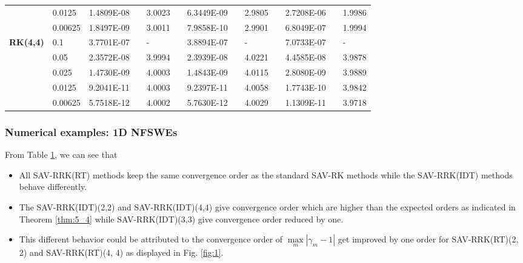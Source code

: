 \documentclass[aspectratio=169]{beamer}
\begin{document}
\begin{frame}
\begin{table}[H]
\begin{tabular}{lllllrlrlrlrlrl}
	  \multicolumn{2}{l}{} & \multicolumn{2}{l}{0.0125} & 1.4809E-08 &       & 3.0023  &       & 6.3449E-09 &       & 2.9805  &       & 2.7208E-06 &       & 1.9986  \\
	  \multicolumn{2}{l}{} & \multicolumn{2}{l}{0.00625} & 1.8497E-09 &       & 3.0011  &       & 7.9858E-10 &       & 2.9901  &       & 6.8049E-07 &       & 1.9994  \\
	  \multicolumn{2}{l}{\multirow{5}[1]{*}{\textbf{RK(4,4)}}} & \multicolumn{2}{l}{0.1} & 3.7701E-07 &       & -     &       & 3.8894E-07 &       & -     &       & 7.0733E-07 &       & - \\
	  \multicolumn{2}{l}{} & \multicolumn{2}{l}{0.05} & 2.3572E-08 &       & 3.9994  &       & 2.3939E-08 &       & 4.0221  &       & 4.4585E-08 &       & 3.9878  \\
	  \multicolumn{2}{l}{} & \multicolumn{2}{l}{0.025} & 1.4730E-09 &       & 4.0003  &       & 1.4843E-09 &       & 4.0115  &       & 2.8080E-09 &       & 3.9889  \\
	  \multicolumn{2}{l}{} & \multicolumn{2}{l}{0.0125} & 9.2041E-11 &       & 4.0003  &       & 9.2397E-11 &       & 4.0058  &       & 1.7743E-10 &       & 3.9842  \\
	  \multicolumn{2}{l}{} & \multicolumn{2}{l}{0.00625} & 5.7518E-12 &       & 4.0002  &       & 5.7630E-12 &       & 4.0029  &       & 1.1309E-11 &       & 3.9718  \\
	  \bottomrule
	  \end{tabular}%
	  \label{tab:6-1}%
	  \end{table}%
	\end{frame}
	
	
	\begin{frame}\frametitle{Numerical examples: 1D NFSWEs}
	From Table \ref{tab:6-1}, we can see that
	\begin{itemize}
	  \item All SAV-RRK(RT) methods keep the same convergence order as the standard SAV-RK methods while the SAV-RRK(IDT) methods behave differently.
	  \item The SAV-RRK(IDT)(2,2) and SAV-RRK(IDT)(4,4) give convergence order  which are higher than the expected orders as indicated in Theorem \ref{thm:5_4} while SAV-RRK(IDT)(3,3) give convergence order reduced by one.
	  \item This different behavior could be attributed to the convergence order of $\max\limits _m\left|\gamma_m-1\right|$ get improved by one order for SAV-RRK(RT)(2, 2) and SAV-RRK(RT)(4, 4) as displayed in Fig. \ref{fig:1}.
	\end{itemize}
	\end{frame}
	
\end{document}
